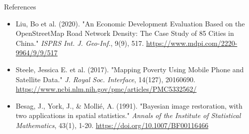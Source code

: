 \documentclass{beamer}
\begin{document}
\begin{frame}{References}
  \begin{itemize}
    \item Liu, Bo et al. (2020). "An Economic Development Evaluation Based on the OpenStreetMap Road Network Density: The Case Study of 85 Cities in China." \textit{ISPRS Int. J. Geo-Inf.}, 9(9), 517. \href{https://www.mdpi.com/2220-9964/9/9/517}{https://www.mdpi.com/2220-9964/9/9/517}
    \item Steele, Jessica E. et al. (2017). "Mapping Poverty Using Mobile Phone and Satellite Data." \textit{J. Royal Soc. Interface}, 14(127), 20160690. \href{https://www.ncbi.nlm.nih.gov/pmc/articles/PMC5332562/}{https://www.ncbi.nlm.nih.gov/pmc/articles/PMC5332562/}
    \item Besag, J., York, J., \& Mollié, A. (1991). "Bayesian image restoration, with two applications in spatial statistics." \textit{Annals of the Institute of Statistical Mathematics}, 43(1), 1-20. \href{https://doi.org/10.1007/BF00116466}{https://doi.org/10.1007/BF00116466}
  \end{itemize}
  \end{frame}
\end{document}

